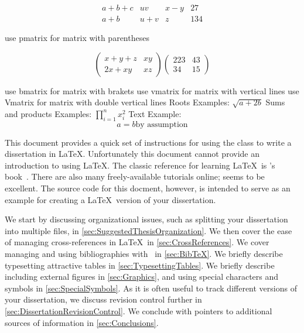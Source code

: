   \[
    \begin{matrix}
     a + b + c & uv        & x - y    & 27 \\
      a + b       & u + v    & z         &  134
    \end{matrix}
  \]
 
use pmatrix for matrix with parentheses

 \[
    \begin{pmatrix}
     x + y + z       & xy \\
      2x + xy        & xz
    \end{pmatrix}
    \begin{pmatrix}
      223       & 43 \\
      34        & 15
    \end{pmatrix}
  \]
 
use bmatrix for matrix with brakets
use vmatrix for matrix with vertical lines
use Vmatrix for matrix with double vertical lines
Roots
Examples:  $\sqrt{a + 2b}$
Sums and products
Examples:  $\prod_{i = 1}^{n} x_{i}^2$
Text
Example: 
  \[
    a = b \mbox{by assumption}
  \]


This document provides a quick set of instructions for using the
 class to write a dissertation in \LaTeX. 
Unfortunately this document cannot provide an introduction to using
\LaTeX.  The classic reference for learning \LaTeX\ is
\citeauthor{lamport-1994-ladps}'s
book~\cite{lamport-1994-ladps}.  There are also many freely-available
tutorials online;
seems to be excellent.
The source code for this docment, however, is intended to serve as
an example for creating a \LaTeX\ version of your dissertation.

We start by discussing organizational issues, such as splitting
your dissertation into multiple files, in
\autoref{sec:SuggestedThesisOrganization}.
We then cover the ease of managing cross-references in \LaTeX\ in
\autoref{sec:CrossReferences}.
We cover managing and using bibliographies with \BibTeX\ in
\autoref{sec:BibTeX}. 
We briefly describe typesetting attractive tables in
\autoref{sec:TypesettingTables}.
We briefly describe including external figures in
\autoref{sec:Graphics}, and using special characters and symbols
in \autoref{sec:SpecialSymbols}.
As it is often useful to track different versions of your dissertation,
we discuss revision control further in
\autoref{sec:DissertationRevisionControl}. 
We conclude with pointers to additional sources of information in
\autoref{sec:Conclusions}.

